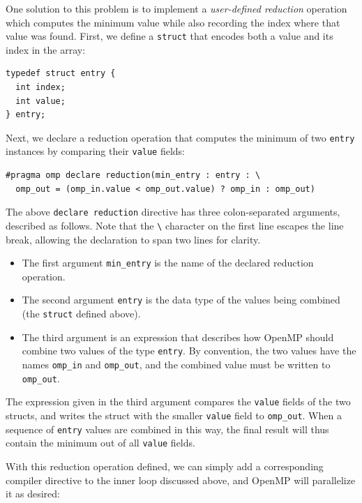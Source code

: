 \documentclass{article}
\theoremstyle{definition}
\begin{document}
One solution to this problem is to implement a \emph{user-defined reduction} operation which computes the minimum value while also recording the index where that value was found. First, we define a \texttt{struct} that encodes both a value and its index in the array:
\begin{verbatim}
typedef struct entry {
  int index;
  int value;
} entry;
\end{verbatim}

Next, we declare a reduction operation that computes the minimum of two \texttt{entry} instances by comparing their \texttt{value} fields:

\begin{verbatim}
#pragma omp declare reduction(min_entry : entry : \
  omp_out = (omp_in.value < omp_out.value) ? omp_in : omp_out)
\end{verbatim}

The above \texttt{declare reduction} directive has three colon-separated arguments, described as follows. Note that the \texttt{\textbackslash} character on the first line escapes the line break, allowing the declaration to span two lines for clarity.

\begin{itemize}
    \item The first argument \texttt{min\_entry} is the name of the declared reduction operation. 
    
    \item The second argument \texttt{entry} is the data type of the values being combined (the \texttt{struct} defined above).
    
    \item The third argument is an expression that describes how OpenMP should combine two values of the type \texttt{entry}. By convention, the two values have the names \texttt{omp\_in} and \texttt{omp\_out}, and the combined value must be written to \texttt{omp\_out}. 
\end{itemize}

The expression given in the third argument compares the \texttt{value} fields of the two structs, and writes the struct with the smaller \texttt{value} field to \texttt{omp\_out}. When a sequence of \texttt{entry} values are combined in this way, the final result will thus contain the minimum out of all \texttt{value} fields.

With this reduction operation defined, we can simply add a corresponding compiler directive to the inner loop discussed above, and OpenMP will parallelize it as desired:
\end{document}
